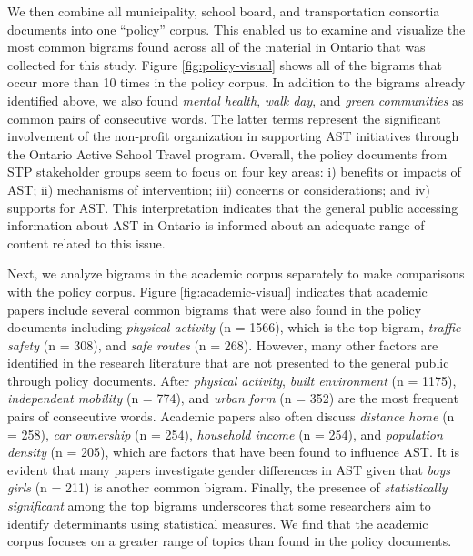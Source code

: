 \documentclass[]{elsarticle} %
\begin{document}
We then combine all municipality, school board, and transportation
consortia documents into one ``policy'' corpus. This enabled us to
examine and visualize the most common bigrams found across all of the
material in Ontario that was collected for this study. Figure
\ref{fig:policy-visual} shows all of the bigrams that occur more than 10
times in the policy corpus. In addition to the bigrams already
identified above, we also found \emph{mental health}, \emph{walk day},
and \emph{green communities} as common pairs of consecutive words. The
latter terms represent the significant involvement of the non-profit
organization in supporting AST initiatives through the Ontario Active
School Travel program. Overall, the policy documents from STP
stakeholder groups seem to focus on four key areas: i) benefits or
impacts of AST; ii) mechanisms of intervention; iii) concerns or
considerations; and iv) supports for AST. This interpretation indicates
that the general public accessing information about AST in Ontario is
informed about an adequate range of content related to this issue.

Next, we analyze bigrams in the academic corpus separately to make
comparisons with the policy corpus. Figure \ref{fig:academic-visual}
indicates that academic papers include several common bigrams that were
also found in the policy documents including \emph{physical activity} (n
= 1566), which is the top bigram, \emph{traffic safety} (n = 308), and
\emph{safe routes} (n = 268). However, many other factors are identified
in the research literature that are not presented to the general public
through policy documents. After \emph{physical activity}, \emph{built
environment} (n = 1175), \emph{independent mobility} (n = 774), and
\emph{urban form} (n = 352) are the most frequent pairs of consecutive
words. Academic papers also often discuss \emph{distance home} (n =
258), \emph{car ownership} (n = 254), \emph{household income} (n = 254),
and \emph{population density} (n = 205), which are factors that have
been found to influence AST. It is evident that many papers investigate
gender differences in AST given that \emph{boys girls} (n = 211) is
another common bigram. Finally, the presence of \emph{statistically
significant} among the top bigrams underscores that some researchers aim
to identify determinants using statistical measures. We find that the
academic corpus focuses on a greater range of topics than found in the
policy documents.
\end{document}
